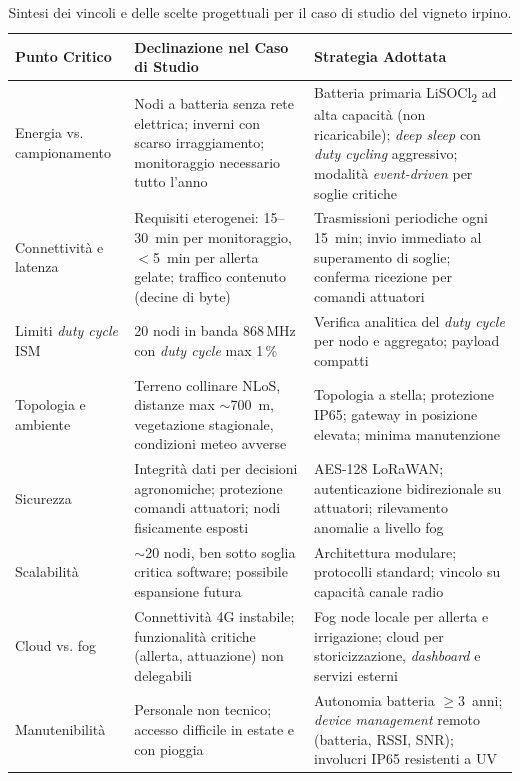 \begin{table}[H]
	\centering
	\small
	\begin{tabularx}{\textwidth}{|l|X|X|}
		\hline
		\textbf{Punto Critico} & \textbf{Declinazione nel Caso di Studio} & \textbf{Strategia Adottata} \\
		\hline
		Energia vs. campionamento & Nodi a batteria senza rete elettrica; inverni con scarso irraggiamento; monitoraggio necessario tutto l'anno & Batteria primaria LiSOCl\textsubscript{2} ad alta capacità (non ricaricabile); \textit{deep sleep} con \textit{duty cycling} aggressivo; modalità \textit{event-driven} per soglie critiche \\
		\hline
		Connettività e latenza & Requisiti eterogenei: 15--30~min per monitoraggio, $<$5~min per allerta gelate; traffico contenuto (decine di byte) & Trasmissioni periodiche ogni 15~min; invio immediato al superamento di soglie; conferma ricezione per comandi attuatori \\
		\hline
		Limiti \textit{duty cycle} ISM & 20 nodi in banda 868\,MHz con \textit{duty cycle} max 1\,\%~\cite{etsi300220} & Verifica analitica del \textit{duty cycle} per nodo e aggregato; payload compatti \\
		\hline
		Topologia e ambiente & Terreno collinare NLoS, distanze max $\sim$700~m, vegetazione stagionale, condizioni meteo avverse & Topologia a stella; protezione IP65; gateway in posizione elevata; minima manutenzione \\
		\hline
		Sicurezza & Integrità dati per decisioni agronomiche; protezione comandi attuatori; nodi fisicamente esposti & AES-128 LoRaWAN; autenticazione bidirezionale su attuatori; rilevamento anomalie a livello fog \\
		\hline
		Scalabilità & $\sim$20 nodi, ben sotto soglia critica software; possibile espansione futura & Architettura modulare; protocolli standard; vincolo su capacità canale radio \\
		\hline
		Cloud vs. fog & Connettività 4G instabile; funzionalità critiche (allerta, attuazione) non delegabili & Fog node locale per allerta e irrigazione; cloud per storicizzazione, \textit{dashboard} e servizi esterni \\
		\hline
		Manutenibilità & Personale non tecnico; accesso difficile in estate e con pioggia & Autonomia batteria $\geq$3~anni; \textit{device management} remoto (batteria, RSSI, SNR); involucri IP65 resistenti a UV \\
		\hline
	\end{tabularx}
	\caption{Sintesi dei vincoli e delle scelte progettuali per il caso di studio del vigneto irpino.}
	\label{tab:vincoli_vigneto}
\end{table}

